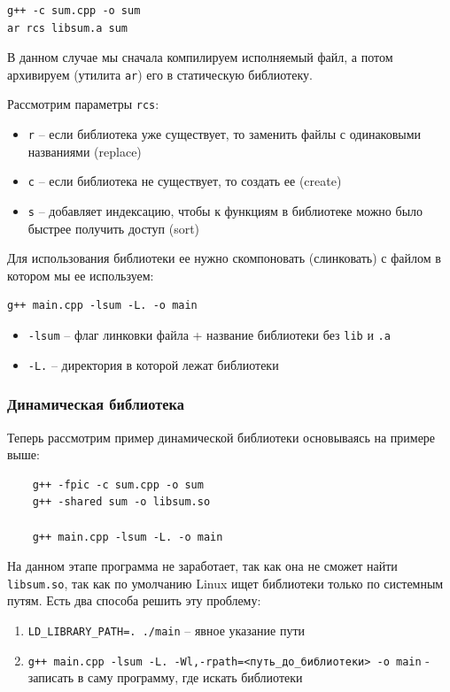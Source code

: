 \begin{verbatim}
g++ -c sum.cpp -o sum
ar rcs libsum.a sum
\end{verbatim}

В данном случае мы сначала компилируем исполняемый файл, а потом архивируем (утилита \texttt{ar}) его в статическую библиотеку.

Рассмотрим параметры \texttt{rcs}:
\begin{itemize}
    \item \texttt{r} -- если библиотека уже существует, то заменить файлы с одинаковыми названиями (replace)
    \item \texttt{c} -- если библиотека не существует, то создать ее (create)
    \item \texttt{s} -- добавляет индексацию, чтобы к функциям в библиотеке можно было быстрее получить доступ (sort)
\end{itemize}

Для использования библиотеки ее нужно скомпоновать (слинковать) с файлом в котором мы ее используем:
\begin{verbatim}
g++ main.cpp -lsum -L. -o main
\end{verbatim}

\begin{itemize}
    \item \texttt{-lsum} -- флаг линковки файла + название библиотеки без \texttt{lib} и \texttt{.a}
    \item \texttt{-L.} -- директория в которой лежат библиотеки
\end{itemize}

\subsubsection*{Динамическая библиотека}

Теперь рассмотрим пример динамической библиотеки основываясь на примере выше:
\begin{verbatim}
    g++ -fpic -c sum.cpp -o sum
    g++ -shared sum -o libsum.so
    
    g++ main.cpp -lsum -L. -o main
\end{verbatim}

На данном этапе программа не заработает, так как она не сможет найти \texttt{libsum.so}, так как по умолчанию Linux ищет библиотеки только по системным путям. Есть два способа решить эту проблему:

\begin{enumerate}
    \item \texttt{LD\_LIBRARY\_PATH=. ./main} -- явное указание пути
    \item \texttt{g++ main.cpp -lsum -L. -Wl,-rpath=<путь\_до\_библиотеки> -o main} - записать в саму программу, где искать библиотеки
\end{enumerate}

